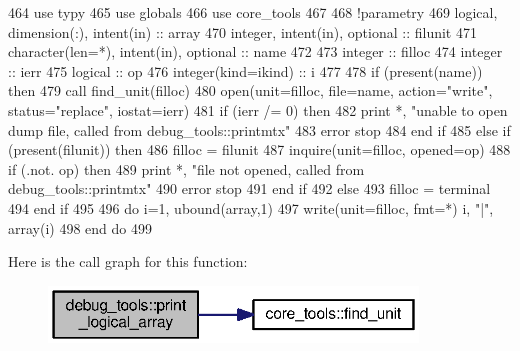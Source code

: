 \begin{DoxyCode}
464       \textcolor{keywordtype}{use }typy
465       \textcolor{keywordtype}{use }globals
466       \textcolor{keywordtype}{use }core_tools
467       
468       \textcolor{comment}{!parametry}
469       \textcolor{keywordtype}{logical}, \textcolor{keywordtype}{dimension(:)}, \textcolor{keywordtype}{intent(in)} :: array
470       \textcolor{keywordtype}{integer}, \textcolor{keywordtype}{intent(in)}, \textcolor{keywordtype}{optional} :: filunit   
471       \textcolor{keywordtype}{character(len=*)}, \textcolor{keywordtype}{intent(in)}, \textcolor{keywordtype}{optional} :: name
472 
473       \textcolor{keywordtype}{integer} :: filloc
474       \textcolor{keywordtype}{integer} :: ierr
475       \textcolor{keywordtype}{logical} :: op
476       \textcolor{keywordtype}{integer(kind=ikind)} :: i
477       
478       \textcolor{keywordflow}{if} (\textcolor{keyword}{present}(name)) \textcolor{keywordflow}{then}
479         \textcolor{keyword}{call }find_unit(filloc)
480         \textcolor{keyword}{open}(unit=filloc, file=name, action=\textcolor{stringliteral}{"write"}, status=\textcolor{stringliteral}{"replace"}, iostat\textcolor{comment}{=ierr)}
481 \textcolor{comment}{        }\textcolor{keywordflow}{if} (ierr /= 0) \textcolor{keywordflow}{then}
482           print *, \textcolor{stringliteral}{"unable to open dump file, called from debug\_tools::printmtx"}
483           error stop
484 \textcolor{keywordflow}{        end if}
485       \textcolor{keywordflow}{else} \textcolor{keywordflow}{if} (\textcolor{keyword}{present}(filunit)) \textcolor{keywordflow}{then}
486         filloc = filunit
487         \textcolor{keyword}{inquire}(unit=filloc, opened=op)
488         \textcolor{keywordflow}{if} (.not. op) \textcolor{keywordflow}{then}
489           print *, \textcolor{stringliteral}{"file not opened, called from debug\_tools::printmtx"}
490           error stop
491 \textcolor{keywordflow}{        end if}
492       \textcolor{keywordflow}{else}
493         filloc = terminal
494 \textcolor{keywordflow}{      end if}
495       
496       \textcolor{keywordflow}{do} i=1, ubound(array,1)
497         \textcolor{keyword}{write}(unit=filloc, fmt=*) i, \textcolor{stringliteral}{"|"}, array(i)
498 \textcolor{keywordflow}{      end do}
499       
\end{DoxyCode}


Here is the call graph for this function\+:\nopagebreak
\begin{figure}[H]
\begin{center}
\leavevmode
\includegraphics[width=278pt]{namespacedebug__tools_a0ec7ce1d32aa97319c670bf4e1c664e1_cgraph}
\end{center}
\end{figure}


